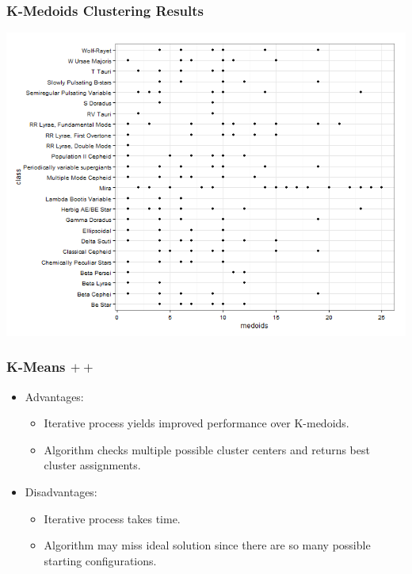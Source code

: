 \documentclass{beamer}
\begin{document}

\begin{frame}
\frametitle{K-Medoids Clustering Results}
\begin{center}
\includegraphics[scale=.4]{medoids.png}
\end{center}
\end{frame}
\begin{frame}
\frametitle{K-Means $++$}
\begin{itemize}
\item Advantages: 
\begin{itemize}
\item Iterative process yields improved performance over K-medoids.
\item Algorithm checks multiple possible cluster centers and returns best cluster assignments.
\end{itemize}
\item Disadvantages: 
\begin{itemize}
\item Iterative process takes time.
\item Algorithm may miss ideal solution since there are so many possible starting configurations.
\end{itemize}
\end{itemize}

\end{frame}
\end{document}
